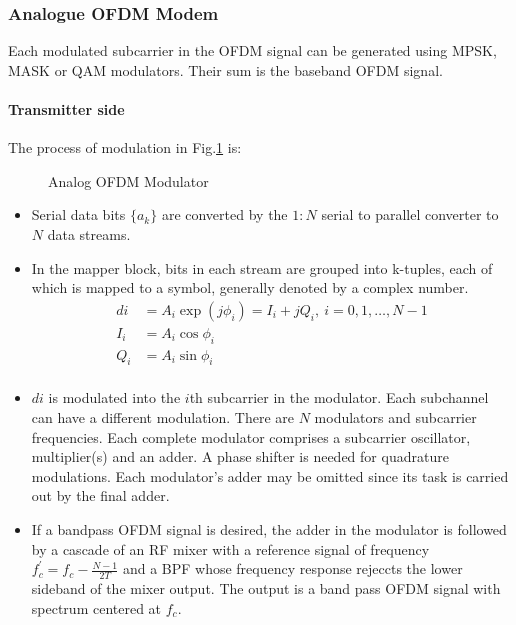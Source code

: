 \subsubsection{Analogue OFDM Modem}
Each modulated subcarrier in the OFDM signal can be generated using MPSK, MASK or QAM modulators. Their sum is the baseband OFDM signal. 
\paragraph{Transmitter side}
The process of modulation in Fig.\ref{fig:anal_mod} is\cite{fuqin}:
\begin{figure}[h!]
	\centerline{\resizebox{16cm}{!}{}}
	\caption{Analog OFDM Modulator}
	\label{fig:anal_mod}
\end{figure}
\begin{itemize}
	\item Serial data bits $\{ a_k\}$ are converted by the $1:N$ serial to parallel converter to $N$ data streams.
	\item In the mapper block, bits in each stream are grouped into k-tuples, each of which is mapped to a symbol, generally denoted by a complex number.
	\begin{align*}
	di &= A_i\exp (j\phi_i) = I_i + jQ_i,\ i=0,1,\ldots,N-1\\
	I_i &= A_i\cos \phi_i\\
	Q_i &= A_i\sin\phi_i\\
	\end{align*}
	\item $di$ is modulated into the $i$th subcarrier in the modulator. Each subchannel can have a different modulation. There are $N$ modulators and subcarrier frequencies. Each complete modulator comprises a subcarrier oscillator, multiplier(s) and an adder. A phase shifter is needed for quadrature modulations. Each modulator's adder may be omitted since its task is carried out by the final adder.
	\item If a bandpass OFDM signal is desired, the adder in the modulator is followed by a cascade of an RF mixer with a reference signal of frequency $f_c^\prime = f_c - \frac{N-1}{2T}$ and a \gls{BPF} whose frequency response rejeccts the lower sideband of the mixer output. The output is a band pass OFDM signal with spectrum centered at $f_c$. 
\end{itemize}

